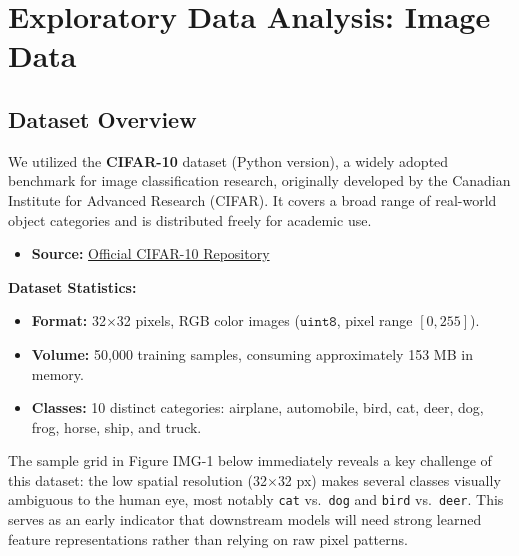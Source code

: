 \documentclass[twoside]{hcmut-report}
\begin{document}



\section{Exploratory Data Analysis: Image Data}
\label{sec:image}

\subsection{Dataset Overview}
We utilized the \textbf{CIFAR-10} dataset (Python version), a widely adopted benchmark
for image classification research, originally developed by the Canadian Institute for
Advanced Research (CIFAR). It covers a broad range of real-world object categories and
is distributed freely for academic use.

\begin{itemize}
    \item \textbf{Source:} \href{https://www.cs.toronto.edu/~kriz/cifar.html}{Official CIFAR-10 Repository}
\end{itemize}

\begin{importantbox}
\textbf{Dataset Statistics:}
\begin{itemize}
    \item \textbf{Format:} 32$\times$32 pixels, RGB color images ($\texttt{uint8}$, pixel range $[0, 255]$).
    \item \textbf{Volume:} 50,000 training samples, consuming approximately 153 MB in memory.
    \item \textbf{Classes:} 10 distinct categories: airplane, automobile, bird, cat, deer,
    dog, frog, horse, ship, and truck.
\end{itemize}
\end{importantbox}

The sample grid in Figure IMG-1 below immediately reveals a key challenge of this dataset: the low spatial resolution (32$\times$32 px) makes several classes visually ambiguous to the human eye, most notably \texttt{cat} vs.\ \texttt{dog} and \texttt{bird} vs.\ \texttt{deer}. This serves as an early indicator that downstream models will need strong learned feature representations rather than relying on raw pixel patterns.
\end{document}
